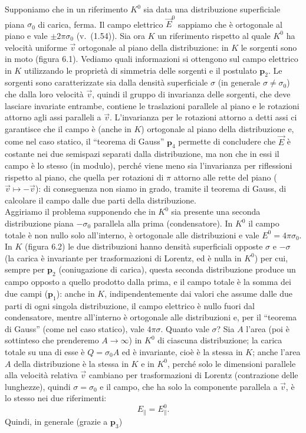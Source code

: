 Supponiamo che in un riferimento $K^0$ sia data una distribuzione superficiale
piana $\sigma_0$ di carica, ferma. Il campo elettrico $\vec E^0$ sappiamo che
\`e ortogonale al piano e vale $\pm2\pi\sigma_0$ \big(v.\ (1.54)\big). Sia ora
$K$ un riferimento rispetto al quale $K^0$ ha velocit\`a uniforme $\vec v$
ortogonale al piano della distribuzione: in $K$ le sorgenti sono in moto (figura
6.1).
Vediamo quali informazioni si ottengono sul campo elettrico in $K$ utilizzando
le propriet\`a di simmetria delle sorgenti e il postulato $\mathbf p_2$. Le
sorgenti sono caratterizzate sia dalla densit\`a superficiale $\sigma$ (in
generale $\sigma\ne\sigma_0$) che dalla loro velocit\`a $\vec v$, quindi il
gruppo di invarianza delle sorgenti, che deve lasciare invariate entrambe,
contiene le traslazioni parallele al piano e le rotazioni attorno agli assi
paralleli a $\vec v$. L'invarianza per le rotazioni attorno a detti assi ci
garantisce che il campo \`e (anche in $K$) ortogonale al piano della
distribuzione e, come nel caso statico, il ``teorema di Gauss'' $\mathbf p_4$
permette di concludere che $\vec E$ \`e costante nei due semispazi separati
dalla distribuzione, ma non che in essi il campo \`e lo stesso (in modulo),
perch\'e viene meno sia l'invarianza per riflessioni rispetto al piano, che
quella per rotazioni di $\pi$ attorno alle rette del piano
($\vec v\mapsto-\vec v$): di conseguenza non siamo in grado, tramite il teorema
di Gauss, di calcolare il campo dalle due parti della distribuzione.\\
Aggiriamo il problema supponendo che in $K^0$ sia presente una seconda
distribuzione piana $-\sigma_0$ parallela alla prima (condensatore). In $K^0$ il
campo totale \`e non nullo solo all'interno, \`e ortogonale alle distribuzioni e
vale $E^0=4\pi\sigma_0$. In $K$ (figura 6.2) le due distribuzioni hanno
densit\`a superficiali opposte $\sigma$ e $-\sigma$ (la carica \`e invariante
per trasformazioni di Lorentz, ed \`e nulla in $K^0$) per cui, sempre per
$\mathbf p_2$ (coniugazione di carica), questa seconda distribuzione produce un
campo opposto a quello prodotto dalla prima, e il campo totale \`e la somma dei
due campi ($\mathbf p_1$): anche in $K$, indipendentemente dai valori che assume
dalle due parti di ogni singola distribuzione, il campo elettrico \`e nullo
fuori dal condensatore, mentre all'interno \`e ortogonale alle distribuzioni e,
per il ``teorema di Gauss'' (come nel caso statico), vale $4\pi\sigma$. Quanto
vale $\sigma$? Sia $A$ l'area (poi \`e sottinteso che prenderemo $A\to\infty$)
in $K^0$ di ciascuna distribuzione; la carica totale su una di esse \`e
$Q=\sigma_0A$ ed \`e invariante, cio\`e \`e la stessa in $K$; anche l'area $A$
della distribuzione \`e la stessa in $K$ e in $K^0$, perch\'e solo le dimensioni
parallele alla velocit\`a relativa $\vec v$ cambiano per trasformazioni di
Lorentz (contrazione delle lunghezze), quindi $\sigma=\sigma_0$ e il campo, che
ha solo la componente parallela a $\vec v$, \`e lo stesso nei due riferimenti:
\begin{equation}
  E_\parallel=E_\parallel^0.
  \tag{6.2}
\end{equation}
Quindi, in generale (grazie a $\mathbf p_3$)

